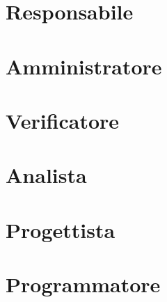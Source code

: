 \documentclass[a4paper, 12pt]{article}
\begin{document}
\copertina{}

\newpage

\setcounter{tocdepth}{2}
\tableofcontents
\newpage

\newpage

\section{Responsabile}





\section{Amministratore}



\section{Verificatore}


%

\section{Analista}


\section{Progettista}


\section{Programmatore}
%
\end{document}
